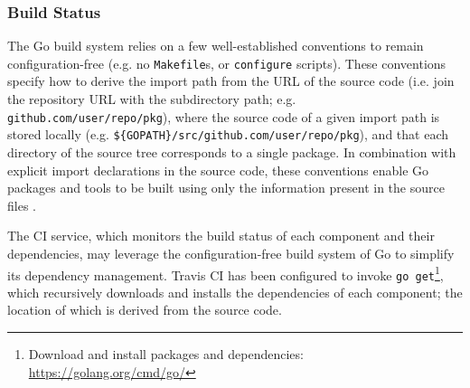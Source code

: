 
\subsubsection{Build Status}

The Go build system relies on a few well-established conventions to remain configuration-free (e.g. no \texttt{Makefile}s, or \texttt{configure} scripts). These conventions specify how to derive the import path from the URL of the source code (i.e. join the repository URL with the subdirectory path; e.g. \texttt{github.com/user/repo/pkg}), where the source code of a given import path is stored locally (e.g. \texttt{\$\{GOPATH\}/src/github.com/user/repo/pkg}), and that each directory of the source tree corresponds to a single package. In combination with explicit import declarations in the source code, these conventions enable Go packages and tools to be built using only the information present in the source files \cite{go_command}.

The CI service, which monitors the build status of each component and their dependencies, may leverage the configuration-free build system of Go to simplify its dependency management. Travis CI has been configured to invoke \texttt{go get}\footnote{Download and install packages and dependencies: \url{https://golang.org/cmd/go/}}, which recursively downloads and installs the dependencies of each component; the location of which is derived from the source code.
